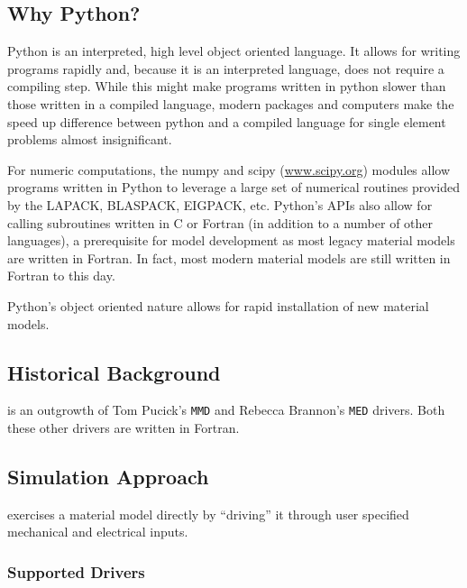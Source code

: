 \documentclass[11pt]{article}
\newcommand{\payette}{{\sc{Payette}}}
\begin{document}
\subsection{Why Python?}
Python is an interpreted, high level object oriented language. It allows for
writing programs rapidly and, because it is an interpreted language, does not
require a compiling step. While this might make programs written in python slower
than those written in a compiled language, modern packages and computers make the
speed up difference between python and a compiled language for single element
problems almost insignificant.

For numeric computations, the numpy and scipy (\url{www.scipy.org}) modules allow
programs written in Python to leverage a large set of numerical routines provided
by the LAPACK, BLASPACK, EIGPACK, etc. Python's APIs also allow for calling
subroutines written in C or Fortran (in addition to a number of other languages),
a prerequisite for model development as most legacy material models are written
in Fortran. In fact, most modern material models are still written in Fortran to
this day.

Python's object oriented nature allows for rapid installation of new material
models.

\subsection{Historical Background}
\payette{} is an outgrowth of Tom Pucick's \texttt{MMD} and Rebecca Brannon's
\texttt{MED} drivers.  Both these other drivers are written in Fortran.

\subsection{Simulation Approach}
\payette{} exercises a material model directly by ``driving'' it through user
specified mechanical and electrical inputs.

\subsubsection{Supported Drivers}
\end{document}
